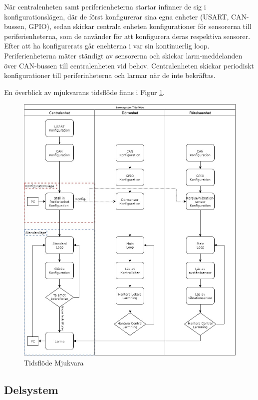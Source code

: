 \documentclass{article}
\begin{document}
När centralenheten samt periferienheterna startar infinner de sig i konfigurationslägen, där de först konfigurerar sina egna enheter (USART, CAN-bussen, GPIO), sedan skickar centrala enheten konfigurationer för sensorerna till periferienheterna, som de använder för att konfigurera deras respektiva sensorer. Efter att ha konfigurerats går enehterna i var sin kontinuerlig loop. Periferienheterna mäter ständigt av sensorerna och skickar larm-meddelanden över CAN-bussen till centralenheten vid behov. Centralenheten skickar periodiskt konfigurationer till periferinheterna och larmar när de inte bekräftas.

En överblick av mjukvarans tidsflöde finns i Figur \ref{fig:tidsflöde}.

\begin{figure}[H]
    \centering
    \includegraphics[width=1\textwidth]{projektrapport/figurer/TidsFlode.jpg}
    \caption{Tidsflöde Mjukvara}
    \label{fig:tidsflöde}
\end{figure}

\subsection{Delsystem }
\end{document}
